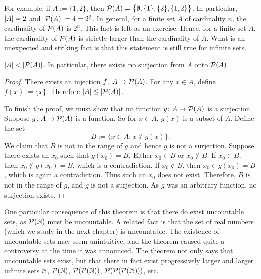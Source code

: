 For example, if $A := \{ 1,2\}$,
then ${\mathcal{P}}(A) = \bigl\{ \emptyset, \{ 1 \}, \{ 2 \}, \{ 1, 2 \} \bigr\}$.
In particular, $\left\lvert {A} \right\rvert = 2$ and $\left\lvert {{\mathcal{P}}(A)} \right\rvert = 4 = 2^2$.
In general,
for a finite set $A$ of cardinality $n$, the
cardinality of ${\mathcal{P}}(A)$ is $2^n$.
This fact is left as an exercise.  
Hence, for a finite set $A$,
the cardinality of ${\mathcal{P}}(A)$ is strictly
larger than the
cardinality of $A$.  What is an unexpected and
striking fact is that this statement is still true for infinite sets.

\begin{thm}
\label{cantorspowersetthm}
$\left\lvert {A} \right\rvert < \left\lvert {{\mathcal{P}}(A)} \right\rvert$.  In particular, there exists no surjection from
$A$ onto ${\mathcal{P}}(A)$.
\end{thm}

\begin{proof}
There exists an injection $f \colon A \to {\mathcal{P}}(A)$.
For any $x \in A$, define $f(x) := \{ x \}$.  Therefore
$\left\lvert {A} \right\rvert \leq \left\lvert {{\mathcal{P}}(A)} \right\rvert$.

To finish the proof, we must show that
no function $g \colon A \to {\mathcal{P}}(A)$ is a surjection.
Suppose 
$g \colon A \to {\mathcal{P}}(A)$ is a function.  So for $x \in A$,
$g(x)$ is a subset of $A$.  Define the set
\begin{equation*}
B := \bigl\{ x \in A : x \notin g(x) \bigr\} .
\end{equation*}
We claim that $B$ is not in the range of $g$ and hence $g$ is not a
surjection.  Suppose there exists an $x_0$ such that $g(x_0) = B$.
Either $x_0 \in B$ or $x_0 \notin B$.  If $x_0 \in B$, then $x_0 \notin
g(x_0) = B$, which is a contradiction.  If $x_0 \notin B$, then $x_0 \in
g(x_0) = B$, which is again a contradiction.  Thus such an $x_0$ does not
exist.  Therefore, $B$ is not in the range of $g$, and $g$ is not a
surjection.  As $g$ was an arbitrary function, no surjection exists.
\end{proof}

One particular consequence of this 
theorem is that there do exist uncountable sets,
as ${\mathcal{P}}({\mathbb{N}})$ must be uncountable.
A related fact is that
the set of real numbers (which we study in the next chapter) is uncountable.
The existence of uncountable sets may seem unintuitive, and the theorem
caused quite a controversy at the time
it was announced.  The theorem not only says that uncountable sets exist,
but that there in fact exist progressively larger
and larger infinite sets ${\mathbb{N}}$, ${\mathcal{P}}({\mathbb{N}})$,
${\mathcal{P}}({\mathcal{P}}({\mathbb{N}}))$, ${\mathcal{P}}({\mathcal{P}}({\mathcal{P}}({\mathbb{N}})))$, etc.


